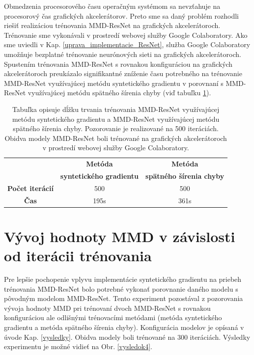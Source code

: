 Obmedzenia procesorového času operačným systémom sa nevzťahuje na procesorový čas grafických akcelerátorov. Preto sme sa daný problém rozhodli riešiť realizáciou trénovania MMD-ResNet na grafických akcelerátoroch. Trénovanie sme vykonávali v prostredí webovej služby Google Colaboratory. Ako sme uviedli v Kap. \ref{uprava_implementacie_ResNet}, služba Google Colaboratory umožňuje bezplatné trénovanie neurónových sieti na grafických akcelerátoroch. Spustením trénovania MMD-ResNet s rovnakou konfiguráciou na grafických akcelerátoroch preukázalo signifikantné zníženie času potrebného na trénovanie MMD-ResNet využívajúcej metódu syntetického gradientu v porovnaní s MMD-ResNet využívajúcej metódu spätného šírenia chyby (viď tabuľku \ref{vysledok3}).

\begin{table}[h!]
\caption[Trénovanie MMD-ResNet na grafických akcelerátoroch]{Tabuľka opisuje dĺžku trvania trénovania MMD-ResNet využívajúcej metódu syntetického gradientu a MMD-ResNet využívajúcej metódu spätného šírenia chyby. Pozorovanie je realizované na 500 iteráciách. Obidva modely MMD-ResNet boli trénované na grafických akcelerátoroch v prostredí webovej služby Google Colaboratory.}
\label{vysledok3}
\begin{center}
\begin{tabular}{|c|c|c|}
\hline
  & \textbf{Metóda} & \textbf{Metóda} \\
  & \textbf{syntetického gradientu} & \textbf{spätného šírenia chyby} \\
\hline
\textbf{Počet iterácií} & 500 & 500 \\
\hline
\textbf{Čas} & 195s & 361s \\
\hline
\end{tabular}%
\end{center}
\end{table}

\section{Vývoj hodnoty MMD v závislosti od iterácii trénovania}
\label{vyvoj_MMD_v_iteraciach}

Pre lepšie pochopenie vplyvu implementácie syntetického gradientu na priebeh trénovania MMD-ResNet bolo potrebné vykonať porovnanie daného modelu s pôvodným modelom MMD-ResNet. Tento experiment pozostával z pozorovania vývoja hodnoty MMD pri trénovaní dvoch MMD-ResNet s rovnakou konfiguráciou ale odlišnými trénovacími metódami (metóda syntetického gradientu a metóda spätného šírenia chyby). Konfigurácia modelov je opísaná v úvode Kap. \ref{vysledky}. Obidva modely boli trénované na 300 iteráciách. Výsledky experimentu je možné vidieť na Obr. \ref{vysledok4}.

